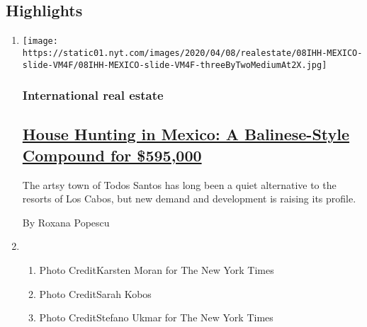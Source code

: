 \hypertarget{highlights}{%
\subsection{Highlights}\label{highlights}}

\begin{enumerate}
\def\labelenumi{\arabic{enumi}.}
\item
  \texttt{[image: https://static01.nyt.com/images/2020/04/08/realestate/08IHH-MEXICO-slide-VM4F/08IHH-MEXICO-slide-VM4F-threeByTwoMediumAt2X.jpg]}

  \hypertarget{international-real-estate}{%
  \subsubsection{International real
  estate}\label{international-real-estate}}

  \hypertarget{house-hunting-in-mexico-a-balinese-style-compound-for-595000}{%
  \subsection{\texorpdfstring{\href{/2020/04/08/realestate/house-hunting-in-mexico-a-balinese-style-compound-for-595000.html}{House
  Hunting in Mexico: A Balinese-Style Compound for
  \$595,000}}{House Hunting in Mexico: A Balinese-Style Compound for \$595,000}}\label{house-hunting-in-mexico-a-balinese-style-compound-for-595000}}

  The artsy town of Todos Santos has long been a quiet alternative to
  the resorts of Los Cabos, but new demand and development is raising
  its profile.

  By Roxana Popescu
\item
  \begin{enumerate}
  \def\labelenumii{\arabic{enumii}.}
  \tightlist
  \item
    Photo CreditKarsten Moran for The New York Times
  \item
    Photo CreditSarah Kobos
  \item
    Photo CreditStefano Ukmar for The New York Times
  \end{enumerate}
\end{enumerate}

